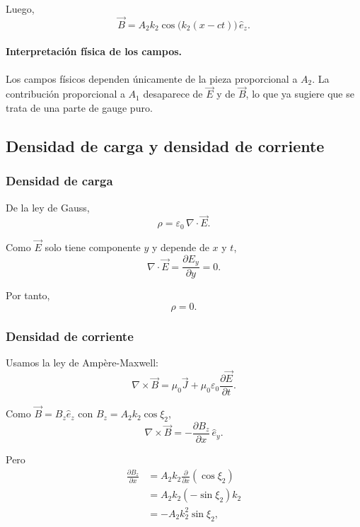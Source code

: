 \documentclass{article}
\numberwithin{equation}{section}
\begin{document}
Luego,
\begin{equation}
\boxed{\vec B=A_2k_2\cos\big(k_2(x-ct)\big)\,\hat e_z.}
\end{equation}


\paragraph{Interpretación física de los campos.}
Los campos físicos dependen únicamente de la pieza proporcional a $A_2$. La contribución proporcional a $A_1$ desaparece de $\vec E$ y de $\vec B$, lo que ya sugiere que se trata de una parte de gauge puro.


\subsection{Densidad de carga y densidad de corriente}
\subsubsection{Densidad de carga}
De la ley de Gauss,
\begin{equation}
\rho=\varepsilon_0\,\nabla\cdot\vec E.
\end{equation}

Como $\vec E$ solo tiene componente $y$ y depende de $x$ y $t$,
\begin{equation}
\nabla\cdot\vec E=\frac{\partial E_y}{\partial y}=0.
\end{equation}

Por tanto,
\begin{equation}
\boxed{\rho=0.}
\end{equation}

\subsubsection{Densidad de corriente}
Usamos la ley de Ampère-Maxwell:
\begin{equation}
\nabla\times\vec B=\mu_0\vec J+\mu_0\varepsilon_0\frac{\partial\vec E}{\partial t}.
\end{equation}

Como $\vec B=B_z\hat e_z$ con $B_z=A_2k_2\cos\xi_2$,
\begin{equation}
\nabla\times\vec B=-\frac{\partial B_z}{\partial x}\,\hat e_y.
\end{equation}

Pero
\begin{align}
\frac{\partial B_z}{\partial x}
&=A_2k_2\frac{\partial}{\partial x}(\cos\xi_2) \\
&=A_2k_2(-\sin\xi_2)k_2 \\
&=-A_2k_2^2\sin\xi_2,
\end{align}
\end{document}
